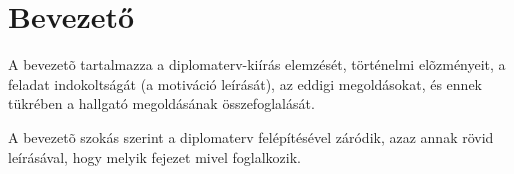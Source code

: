 \chapter*{Bevezető}

A bevezetõ tartalmazza a diplomaterv-kiírás elemzését, történelmi elõzményeit, a feladat
indokoltságát (a motiváció leírását), az eddigi megoldásokat, és ennek tükrében a hallgató
megoldásának összefoglalását.

A bevezetõ szokás szerint a diplomaterv felépítésével záródik, azaz annak rövid leírásával, hogy
melyik fejezet mivel foglalkozik.

